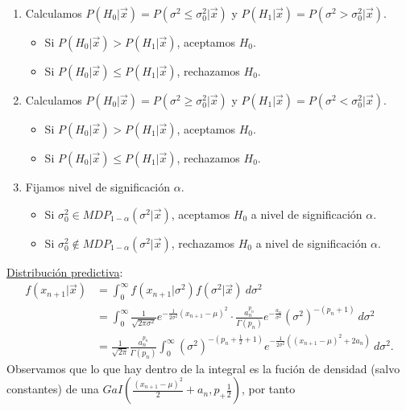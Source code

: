 \begin{enumerate}
    \item Calculamos $P(H_0 | \vec{x}) = P(\sigma^2\leq \sigma^2_0 |\vec{x})$ y $P(H_1 | \vec{x}) = P(\sigma^2 > \sigma^2_0 | \vec{x})$.
    \begin{itemize}
        \item Si $P(H_0 | \vec{x}) > P(H_1 | \vec{x})$, aceptamos $H_0$.
        \item Si $P(H_0 | \vec{x}) \leq P(H_1 | \vec{x})$, rechazamos $H_0$.
    \end{itemize}
        \item Calculamos $P(H_0 | \vec{x}) = P(\sigma^2 \ge \sigma^2_0 |\vec{x})$ y $P(H_1 | \vec{x}) = P(\sigma^2< \sigma^2_0 | \vec{x})$.
    \begin{itemize}
        \item Si $P(H_0 | \vec{x}) > P(H_1 | \vec{x})$, aceptamos $H_0$.
        \item Si $P(H_0 | \vec{x}) \leq P(H_1 | \vec{x})$, rechazamos $H_0$.
    \end{itemize}
    \item Fijamos nivel de significación $\alpha$.
    \begin{itemize}
        \item Si $\sigma^2_0 \in MDP_{1 - \alpha}(\sigma^2 | \vec{x})$, aceptamos $H_0$ a nivel de significación $\alpha$.
        \item Si $\sigma^2_0 \not\in MDP_{1 - \alpha}(\sigma^2| \vec{x})$, rechazamos $H_0$ a nivel de significación $\alpha$.
    \end{itemize}
\end{enumerate}
\underline{Distribución predictiva}:
\begin{align*}
    f(x_{n+1} | \vec{x}) &= \int_{0}^{\infty} f(x_{n+1} | \sigma^2) f(\sigma^2 | \vec{x}) \ d\sigma^2\\
    &= \int_{0}^{\infty} \frac{1}{\sqrt{2\pi\sigma^2}} e^{- \frac{1}{2\sigma^2}(x_{n+1} - \mu)^2} \cdot \frac{a_n^{p_n}}{\Gamma(p_n)}e^{-\frac{a_n}{\sigma^2}}\left( \sigma^2 \right)^{-(p_n+1)} \ d\sigma^2 \\
    &= \frac{1}{\sqrt{2\pi}}\frac{a_n^{p_n}}{\Gamma(p_n)} \int_{0}^{\infty} \left( \sigma^2 \right)^{-\left(p_n + \frac{1}{2} +1 \right)}e^{-\frac{1}{2\sigma^2}((x_{n+1} - \mu)^2 + 2a_n)} \ d\sigma^2.
\end{align*}
Observamos que lo que hay dentro de la integral es la fución de densidad (salvo constantes) de una $GaI\left( \frac{(x_{n+1} - \mu)^2}{2} + a_n, p_ + \frac{1}{2} \right)$, por tanto
